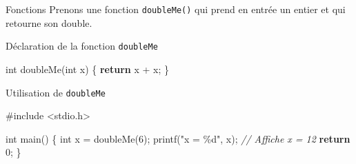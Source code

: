 \documentclass[
  10pt,
  french,
  ignorenonframetext,
  aspectratio=169,
]{beamer}
\newenvironment{Shaded}{}{}
\newcommand{\CommentTok}[1]{\textcolor[rgb]{0.38,0.63,0.69}{\textit{#1}}}
\newcommand{\ControlFlowTok}[1]{\textcolor[rgb]{0.00,0.44,0.13}{\textbf{#1}}}
\newcommand{\DataTypeTok}[1]{\textcolor[rgb]{0.56,0.13,0.00}{#1}}
\newcommand{\DecValTok}[1]{\textcolor[rgb]{0.25,0.63,0.44}{#1}}
\newcommand{\ImportTok}[1]{#1}
\newcommand{\NormalTok}[1]{#1}
\newcommand{\OperatorTok}[1]{\textcolor[rgb]{0.40,0.40,0.40}{#1}}
\newcommand{\PreprocessorTok}[1]{\textcolor[rgb]{0.74,0.48,0.00}{#1}}
\newcommand{\StringTok}[1]{\textcolor[rgb]{0.25,0.44,0.63}{#1}}
\begin{document}
\begin{frame}[fragile]{Fonctions}
\protect\hypertarget{fonctions-1}{}
Prenons une fonction \texttt{doubleMe()} qui prend en entrée un entier
et qui retourne son double.

\begin{block}{Déclaration de la fonction \texttt{doubleMe}}
\protect\hypertarget{duxe9claration-de-la-fonction-doubleme}{}
\begin{Shaded}
\begin{Highlighting}[]
\DataTypeTok{int}\NormalTok{ doubleMe}\OperatorTok{(}\DataTypeTok{int}\NormalTok{ x}\OperatorTok{)} \OperatorTok{\{}
    \ControlFlowTok{return}\NormalTok{ x }\OperatorTok{+}\NormalTok{ x}\OperatorTok{;}
\OperatorTok{\}}
\end{Highlighting}
\end{Shaded}
\end{block}

\begin{block}{Utilisation de \texttt{doubleMe}}
\protect\hypertarget{utilisation-de-doubleme}{}
\begin{Shaded}
\begin{Highlighting}[]
\PreprocessorTok{\#include }\ImportTok{\textless{}stdio.h\textgreater{}}

\DataTypeTok{int}\NormalTok{ main}\OperatorTok{()} \OperatorTok{\{}
    \DataTypeTok{int}\NormalTok{ x }\OperatorTok{=}\NormalTok{ doubleMe}\OperatorTok{(}\DecValTok{6}\OperatorTok{);}
\NormalTok{    printf}\OperatorTok{(}\StringTok{"x = \%d"}\OperatorTok{,}\NormalTok{ x}\OperatorTok{);} \CommentTok{// Affiche x = 12}
    \ControlFlowTok{return} \DecValTok{0}\OperatorTok{;}
\OperatorTok{\}}
\end{Highlighting}
\end{Shaded}
\end{block}
\end{frame}
\end{document}
